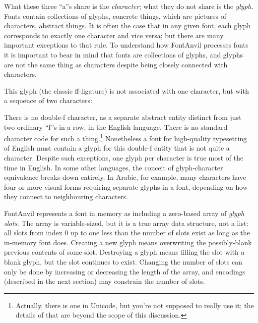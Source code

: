 \documentclass[11pt]{report}
\begin{document}
\begin{center}
\qquad
{}\qquad
{}
\end{center}

What these three ``a''s share is the \emph{character}; what they do not
share is the \emph{glyph}.  Fonts contain collections of glyphs, concrete
things, which are pictures of characters, abstract things.  It is often the
case that in any given font, each glyph corresponds to exactly one character
and vice versa; but there are many important exceptions to that rule.  To
understand how FontAnvil processes fonts it is important to bear in mind
that fonts are collections of glyphs, and glyphs are not the same thing as
characters despite being closely connected with characters.

This glyph (the classic ff-ligature) is not associated with one character,
but with a sequence of two characters:

\begin{center}
\end{center}

There is no double-f character, as a separate abstract entity distinct from
just two ordinary ``f''s in a row, in the English language.  There is no
standard character code for such a thing.\footnote{Actually, there is one in
Unicode, but you're not supposed to really use it; the details of that are
beyond the scope of this discussion.} Nonetheless a font for high-quality
typesetting of English must contain a glyph for this double-f entity
that is not quite a character.  Despite such exceptions, one glyph per
character is true most of the time in English.  In some other languages, the
conceit of glyph-character equivalence breaks down entirely.  In Arabic, for
example, many characters have four or more visual forms requiring
separate glyphs in a font, depending on how they connect to neighbouring
characters.

FontAnvil represents a font in memory as including a zero-based array of
\emph{glyph slots}.  The array is variable-sized, but it is a true array
data structure, not a list: all slots from index 0 up to one less than the
number of slots exist as long as the in-memory font does.  Creating a new
glyph means overwriting the possibly-blank previous contents of some slot. 
Destroying a glyph means filling the slot with a blank glyph, but the slot
continues to exist.  Changing the number of slots can only be done by
increasing or decreasing the length of the array, and encodings (described
in the next section) may constrain the number of slots.
\end{document}
